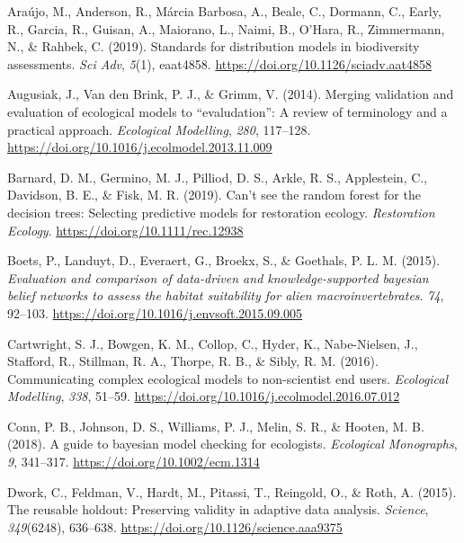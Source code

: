 \documentclass[
]{article}
\newlength{\cslhangindent}
\newenvironment{CSLReferences}[2] %
 {\begin{list}{}{%
  \setlength{\itemindent}{0pt}
  \setlength{\leftmargin}{0pt}
  \setlength{\parsep}{0pt}
  \ifodd #1
   \setlength{\leftmargin}{\cslhangindent}
   \setlength{\itemindent}{-1\cslhangindent}
  \fi
  \setlength{\itemsep}{#2\baselineskip}}}
 {\end{list}}
\begin{document}
\label{refs}
\begin{CSLReferences}{1}{0}
Araújo, M., Anderson, R., Márcia Barbosa, A., Beale, C., Dormann, C.,
Early, R., Garcia, R., Guisan, A., Maiorano, L., Naimi, B., O'Hara, R.,
Zimmermann, N., \& Rahbek, C. (2019). Standards for distribution models
in biodiversity assessments. \emph{Sci Adv}, \emph{5}(1), eaat4858.
\url{https://doi.org/10.1126/sciadv.aat4858}

Augusiak, J., Van den Brink, P. J., \& Grimm, V. (2014). Merging
validation and evaluation of ecological models to {``evaludation''}: A
review of terminology and a practical approach. \emph{Ecological
Modelling}, \emph{280}, 117--128.
\url{https://doi.org/10.1016/j.ecolmodel.2013.11.009}

Barnard, D. M., Germino, M. J., Pilliod, D. S., Arkle, R. S.,
Applestein, C., Davidson, B. E., \& Fisk, M. R. (2019). Can't see the
random forest for the decision trees: Selecting predictive models for
restoration ecology. \emph{Restoration Ecology}.
\url{https://doi.org/10.1111/rec.12938}

Boets, P., Landuyt, D., Everaert, G., Broekx, S., \& Goethals, P. L. M.
(2015). \emph{Evaluation and comparison of data-driven and
knowledge-supported bayesian belief networks to assess the habitat
suitability for alien macroinvertebrates}. \emph{74}, 92--103.
\url{https://doi.org/10.1016/j.envsoft.2015.09.005}

Cartwright, S. J., Bowgen, K. M., Collop, C., Hyder, K., Nabe-Nielsen,
J., Stafford, R., Stillman, R. A., Thorpe, R. B., \& Sibly, R. M.
(2016). Communicating complex ecological models to non-scientist end
users. \emph{Ecological Modelling}, \emph{338}, 51--59.
\url{https://doi.org/10.1016/j.ecolmodel.2016.07.012}

Conn, P. B., Johnson, D. S., Williams, P. J., Melin, S. R., \& Hooten,
M. B. (2018). A guide to bayesian model checking for ecologists.
\emph{Ecological Monographs}, \emph{9}, 341--317.
\url{https://doi.org/10.1002/ecm.1314}

Dwork, C., Feldman, V., Hardt, M., Pitassi, T., Reingold, O., \& Roth,
A. (2015). The reusable holdout: Preserving validity in adaptive data
analysis. \emph{Science}, \emph{349}(6248), 636--638.
\url{https://doi.org/10.1126/science.aaa9375}


\end{CSLReferences}
\end{document}
